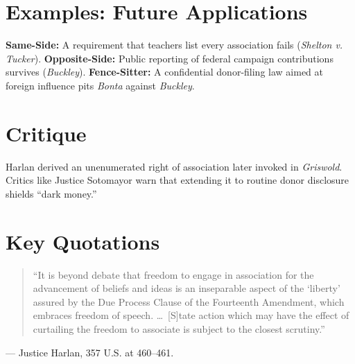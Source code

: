 \documentclass[12pt]{article}
\begin{document}
\section{Examples: Future Applications}
\textbf{Same-Side:} A requirement that teachers list every association fails (\textit{Shelton v. Tucker}). \textbf{Opposite-Side:} Public reporting of federal campaign contributions survives (\textit{Buckley}). \textbf{Fence-Sitter:} A confidential donor-filing law aimed at foreign influence pits \textit{Bonta} against \textit{Buckley}.

\section{Critique}
Harlan derived an unenumerated right of association later invoked in \textit{Griswold}. Critics like Justice Sotomayor warn that extending it to routine donor disclosure shields ``dark money.''

\section{Key Quotations}
\begin{quote}
``It is beyond debate that freedom to engage in association for the advancement of beliefs and ideas is an inseparable aspect of the `liberty' assured by the Due Process Clause of the Fourteenth Amendment, which embraces freedom of speech. \dots\ [S]tate action which may have the effect of curtailing the freedom to associate is subject to the closest scrutiny.''
\end{quote}
\noindent --- Justice Harlan, 357 U.S. at 460--461.
\end{document}
